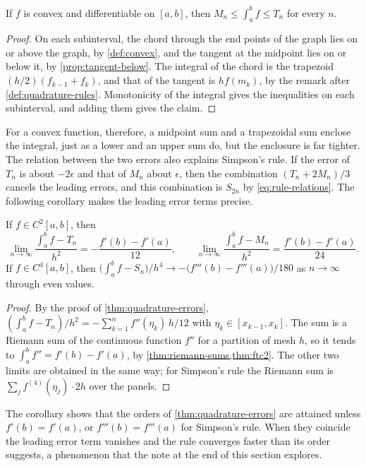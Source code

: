 \begin{proposition}
\label{prop:convex-quadrature}
If $f$ is convex and differentiable on $[a,b]$, then $M_n\le\int_a^bf\le T_n$ for every $n$.
\end{proposition}

\begin{proof}
On each subinterval, the chord through the end points of the graph lies on or above the graph, by \cref{def:convex}, and the tangent at the midpoint lies on or below it, by \cref{prop:tangent-below}. The integral of the chord is the trapezoid $(h/2)(f_{k-1}+f_k)$, and that of the tangent is $hf(m_k)$, by the remark after \cref{def:quadrature-rules}. Monotonicity of the integral gives the inequalities on each subinterval, and adding them gives the claim.
\end{proof}

For a convex function, therefore, a midpoint sum and a trapezoidal sum enclose the integral, just as a lower and an upper sum do, but the enclosure is far tighter. The relation between the two errors also explains Simpson's rule. If the error of $T_n$ is about $-2\epsilon$ and that of $M_n$ about $\epsilon$, then the combination $(T_n+2M_n)/3$ cancels the leading errors, and this combination is $S_{2n}$ by \eqref{eq:rule-relations}. The following corollary makes the leading error terms precise.

\begin{corollary}
\label{cor:asymptotic-errors}
If $f\in C^2[a,b]$, then
\[
\lim_{n\to\infty}\frac{\int_a^bf-T_n}{h^2}=-\frac{f'(b)-f'(a)}{12},\qquad\lim_{n\to\infty}\frac{\int_a^bf-M_n}{h^2}=\frac{f'(b)-f'(a)}{24} .
\]
If $f\in C^4[a,b]$, then $\bigl(\int_a^bf-S_n\bigr)/h^4\to-\bigl(f'''(b)-f'''(a)\bigr)/180$ as $n\to\infty$ through even values.
\end{corollary}

\begin{proof}
By the proof of \cref{thm:quadrature-errors}, $(\int_a^bf-T_n)/h^2=-\sum_{k=1}^nf''(\eta_k)\,h/12$ with $\eta_k\in[x_{k-1},x_k]$. The sum is a Riemann sum of the continuous function $f''$ for a partition of mesh $h$, so it tends to $\int_a^bf''=f'(b)-f'(a)$, by \cref{thm:riemann-sums,thm:ftc2}. The other two limits are obtained in the same way; for Simpson's rule the Riemann sum is $\sum_jf^{(4)}(\eta_j)\cdot2h$ over the panels.
\end{proof}

The corollary shows that the orders of \cref{thm:quadrature-errors} are attained unless $f'(b)=f'(a)$, or $f'''(b)=f'''(a)$ for Simpson's rule. When they coincide the leading error term vanishes and the rule converges faster than its order suggests, a phenomenon that the note at the end of this section explores.

